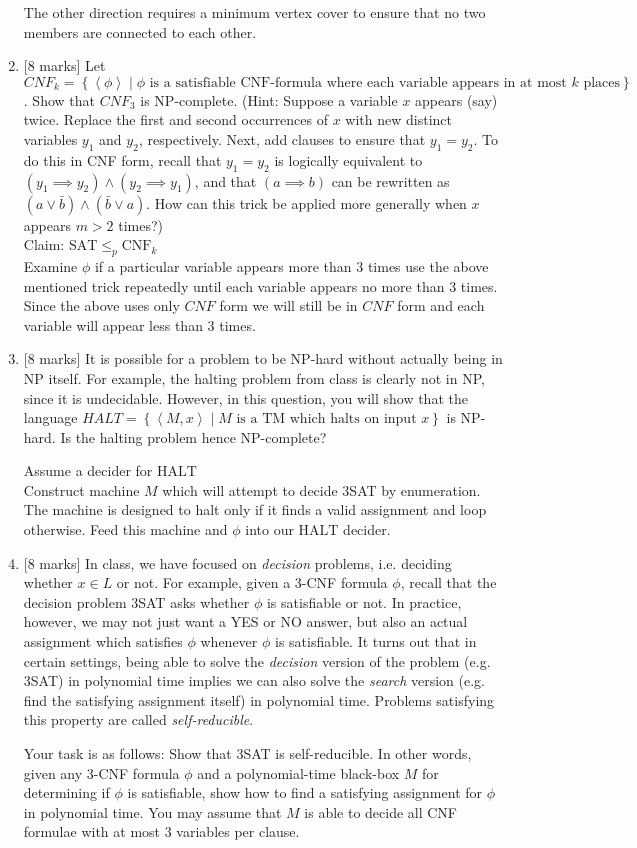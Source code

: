\documentclass{article}
\newcommand{\class}[1]{\text{#1}}
\newcommand{\set}[1]{{\left\{#1\right\}}}    %
\newcommand{\enc}[1]{\left<#1\right>}
\begin{document}
\begin{enumerate}
The other direction requires a minimum vertex cover to ensure that no two members are connected to each other. 

    \item {[8 marks]} Let $CNF_k=\set{\enc{\phi}\mid\phi\text{ is a satisfiable CNF-formula where each variable appears in at most }k\text{ places}}$. Show that ${CNF}_3$ is NP-complete. (Hint: Suppose a variable $x$ appears (say) twice. Replace the first and second occurrences of $x$ with new distinct variables $y_1$ and $y_2$, respectively. Next, add clauses to ensure that $y_1=y_2$. To do this in CNF form, recall that $y_1=y_2$ is logically equivalent to $(y_1\implies y_2)\wedge(y_2\implies y_1)$, and that $(a\implies b)$ can be rewritten as $(a\vee \bar{b})\wedge (\bar{b}\vee {a})$. How can this trick be applied more generally when $x$ appears $m>2$ times?) \\
    Claim: $\class{SAT} \leq_p \class{CNF}_k$ \\
    Examine $\phi$ if a particular variable appears more than 3 times use the above mentioned trick repeatedly until each variable appears no more than 3 times. Since the above uses only $CNF$ form we will still be in $CNF$ form and each variable will appear less than 3 times.
    
    
    \item {[8 marks]} It is possible for a problem to be NP-hard without actually being in NP itself. For example, the halting problem from class is clearly not in NP, since it is undecidable. However, in this question, you will show that the language $HALT=\set{\enc{M,x}\mid M\text{ is a TM which halts on input }x}$ is NP-hard. Is the halting problem hence NP-complete?
    
Assume a decider for $\class{HALT}$\\
Construct machine $M$ which will attempt to decide 3SAT by enumeration. The machine is designed to halt only if it finds a valid assignment and loop otherwise. Feed this machine and $\phi$ into our $\class{HALT}$ decider. 
    
    \item {[8 marks]} In class, we have focused on \emph{decision} problems, i.e. deciding whether $x\in L$ or not. For example, given a 3-CNF formula $\phi$, recall that the decision problem 3SAT asks whether $\phi$ is satisfiable or not. In practice, however, we may not just want a YES or NO answer, but also an actual assignment which satisfies $\phi$ whenever $\phi$ is satisfiable. It turns out that in certain settings, being able to solve the \emph{decision} version of the problem (e.g. 3SAT) in polynomial time implies we can also solve the \emph{search} version (e.g. find the satisfying assignment itself) in polynomial time. Problems satisfying this property are called \emph{self-reducible}.

Your task is as follows: Show that 3SAT is self-reducible. In other words, given any 3-CNF formula $\phi$ and a polynomial-time black-box $M$ for determining if $\phi$ is satisfiable, show how to find a satisfying assignment for $\phi$ in polynomial time. You may assume that $M$ is able to decide all CNF formulae with {at most} 3 variables per clause.
\end{enumerate}
\end{document}
